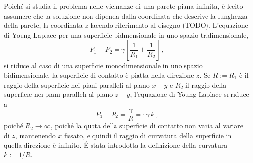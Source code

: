 Poiché si studia il problema nelle vicinanze di una parete piana infinita, è lecito assumere che la soluzione non dipenda dalla coordinata che descrive la lunghezza della parete, la coordinata $z$ facendo riferimento al disegno {\color{red} (TODO)}. L'equazione di Young-Laplace per una superficie bidmensionale in uno spazio tridimensionale,
\begin{equation}
 P_1 - P_2 = \gamma \left[ \dfrac{1}{R_1} + \dfrac{1}{R_2} \right] \ ,
\end{equation}
si riduce al caso di una superficie monodimensionale in uno spazio bidimensionale, la superficie di contatto è piatta nella direzione $z$. Se $R:=R_1$ è il raggio della superficie nei piani paralleli al piano $x-y$ e $R_2$ il raggio della superficie nei piani paralleli al piano $z-y$, l'equazione di Young-Laplace si riduce a
\begin{equation}
  P_1 - P_2 = \dfrac{\gamma}{R} =: \gamma \, k  \ ,
\end{equation}
poiché $R_2 \rightarrow \infty$, poiché la quota della superficie di contatto non varia al variare di $z$, mantenendo $x$ fissato, e quindi il raggio di curvatura della superficie in quella direzione è infinito. \'E stata introdotta la definizione della curvatura $k := 1/R$.

